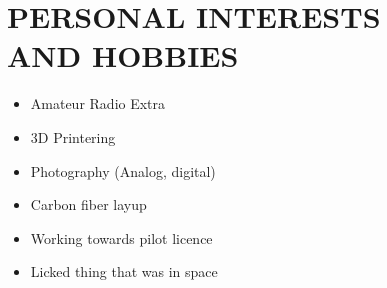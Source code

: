 \documentclass[line,mmmargin]{res}
\begin{document}
\begin{resume}
\begin{multicols}{2}
\begin{itemize}
			\end{itemize}
		\end{multicols}

\section{PERSONAL INTERESTS \\ AND HOBBIES}             
				\begin{multicols}{2}
					\begin{itemize}
						\itemsep -2pt
	\item[]Amateur Radio Extra
	\item[]3D Printering
	\item[]Photography (Analog, digital)
	\item[]Carbon fiber layup
	\item[]Working towards pilot licence
	\item[]Licked thing that was in space

	\end{itemize}
	\end{multicols}


\end{resume}
\end{document}
